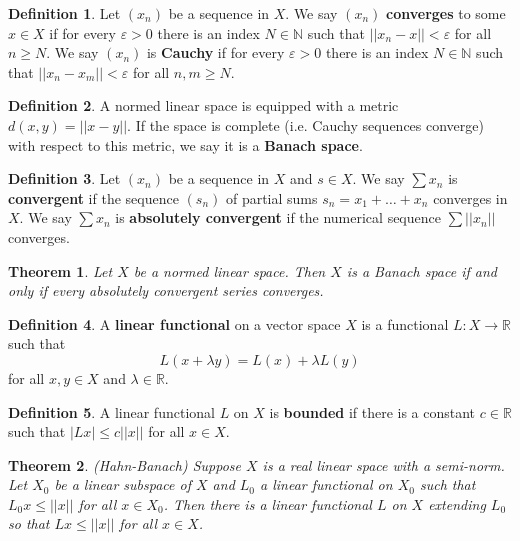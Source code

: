 \documentclass[11pt]{amsart}
\newtheorem*{theorem*}{Theorem}
\theoremstyle{definition}
\newtheorem*{definition*}{Definition}
\renewcommand\geq{\geqslant}
\renewcommand\leq{\leqslant}
\renewcommand\:{\colon}
\newcommand{\N}{\mathds{N}}
\newcommand{\R}{\mathds{R}}
\begin{document}
\begin{definition*}
	Let $(x_n)$ be a sequence in $X$. We say $(x_n)$ \textbf{converges} to some $x \in X$ if for every $\varepsilon > 0$ there is an index $N \in \N$ such that $||x_n - x|| < \varepsilon$ for all $n \geq N$. We say $(x_n)$ is \textbf{Cauchy} if for every $\varepsilon > 0$ there is an index $N \in \N$ such that $||x_n - x_m|| < \varepsilon$ for all $n, m \geq N$. 
\end{definition*}

\begin{definition*}
	A normed linear space is equipped with a metric $d(x,y) = ||x - y||$. If the space is complete (i.e. Cauchy sequences converge) with respect to this metric, we say it is a \textbf{Banach space}.
\end{definition*}

\begin{definition*}
	Let $(x_n)$ be a sequence in $X$ and $s \in X$. We say $\sum x_n$ is \textbf{convergent} if the sequence $(s_n)$ of partial sums $s_n = x_1 + \dots + x_n$ converges in $X$. We say $\sum x_n$ is \textbf{absolutely convergent} if the numerical sequence $\sum ||x_n||$ converges.
\end{definition*}

\begin{theorem*}
	Let $X$ be a normed linear space. Then $X$ is a Banach space if and only if every absolutely convergent series converges.
\end{theorem*}

\begin{definition*}
	A \textbf{linear functional} on a vector space $X$ is a functional $L\: X \to \R$ such that
		\[ L(x + \lambda y) = L(x) + \lambda L(y) \]
	for all $x, y \in X$ and $\lambda \in \R$.
\end{definition*}

\begin{definition*}
	A linear functional $L$ on $X$ is \textbf{bounded} if there is a constant $c \in \R$ such that $|Lx| \leq c||x||$ for all $x \in X$.
\end{definition*}

\begin{theorem*}
	\textnormal{(Hahn-Banach)} Suppose $X$ is a real linear space with a semi-norm. Let $X_0$ be a linear subspace of $X$ and $L_0$ a linear functional on $X_0$ such that $L_0x \leq ||x||$ for all $x \in X_0$. Then there is a linear functional $L$ on $X$ extending $L_0$ so that $Lx \leq ||x||$ for all $x \in X$.
\end{theorem*}
\end{document}
